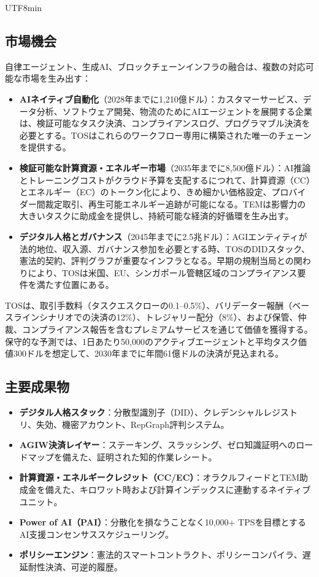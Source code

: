 \documentclass[11pt]{article}
\begin{document}
\begin{CJK}{UTF8}{min}
\subsection{市場機会}
自律エージェント、生成AI、ブロックチェーンインフラの融合は、複数の対応可能な市場を生み出す：
\begin{itemize}[noitemsep]
  \item \textbf{AIネイティブ自動化}（2028年までに1,210億ドル）：カスタマーサービス、データ分析、ソフトウェア開発、物流のためにAIエージェントを展開する企業は、検証可能なタスク決済、コンプライアンスログ、プログラマブル決済を必要とする。TOSはこれらのワークフロー専用に構築された唯一のチェーンを提供する。
  \item \textbf{検証可能な計算資源・エネルギー市場}（2035年までに8,500億ドル）：AI推論とトレーニングコストがクラウド予算を支配するにつれて、計算資源（CC）とエネルギー（EC）のトークン化により、きめ細かい価格設定、プロバイダー間裁定取引、再生可能エネルギー追跡が可能になる。TEMは影響力の大きいタスクに助成金を提供し、持続可能な経済的好循環を生み出す。
  \item \textbf{デジタル人格とガバナンス}（2045年までに2.5兆ドル）：AGIエンティティが法的地位、収入源、ガバナンス参加を必要とする時、TOSのDIDスタック、憲法的契約、評判グラフが重要なインフラとなる。早期の規制当局との関わりにより、TOSは米国、EU、シンガポール管轄区域のコンプライアンス要件を満たす位置にある。
\end{itemize}

TOSは、取引手数料（タスクエスクローの0.1--0.5\%）、バリデーター報酬（ベースラインシナリオでの決済の12\%）、トレジャリー配分（8\%）、および保管、仲裁、コンプライアンス報告を含むプレミアムサービスを通じて価値を獲得する。保守的な予測では、1日あたり50,000のアクティブエージェントと平均タスク価値300ドルを想定して、2030年までに年間61億ドルの決済が見込まれる。

\subsection{主要成果物}
\begin{itemize}[noitemsep]
  \item \textbf{デジタル人格スタック}：分散型識別子（DID）、クレデンシャルレジストリ、失効、機密アカウント、RepGraph評判システム。
  \item \textbf{AGIW決済レイヤー}：ステーキング、スラッシング、ゼロ知識証明へのロードマップを備えた、証明された知的作業レシート。
  \item \textbf{計算資源・エネルギークレジット（CC/EC）}：オラクルフィードとTEM助成金を備えた、キロワット時および計算インデックスに連動するネイティブユニット。
  \item \textbf{Power of AI（PAI）}：分散化を損なうことなく10,000+ TPSを目標とするAI支援コンセンサススケジューリング。
  \item \textbf{ポリシーエンジン}：憲法的スマートコントラクト、ポリシーコンパイラ、遅延耐性決済、可逆的履歴。
\end{itemize}


\end{CJK}
\end{document}

